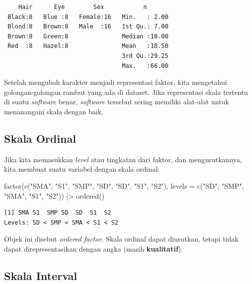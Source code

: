 \documentclass[
  letterpaper,
  DIV=11,
  numbers=noendperiod]{scrreprt}
\newenvironment{Shaded}{\begin{snugshade}}{\end{snugshade}}
\newcommand{\AttributeTok}[1]{\textcolor[rgb]{0.40,0.45,0.13}{#1}}
\newcommand{\FunctionTok}[1]{\textcolor[rgb]{0.28,0.35,0.67}{#1}}
\newcommand{\NormalTok}[1]{\textcolor[rgb]{0.00,0.23,0.31}{#1}}
\newcommand{\SpecialCharTok}[1]{\textcolor[rgb]{0.37,0.37,0.37}{#1}}
\newcommand{\StringTok}[1]{\textcolor[rgb]{0.13,0.47,0.30}{#1}}
\begin{document}
\begin{verbatim}
    Hair      Eye        Sex           n        
 Black:8   Blue :8   Female:16   Min.   : 2.00  
 Blond:8   Brown:8   Male  :16   1st Qu.: 7.00  
 Brown:8   Green:8               Median :10.00  
 Red  :8   Hazel:8               Mean   :18.50  
                                 3rd Qu.:29.25  
                                 Max.   :66.00  
\end{verbatim}

Setelah mengubah karakter menjadi representasi faktor, kita mengetahui
golongan-golongan rambut yang ada di dataset. Jika representasi skala
tertentu di suatu \emph{software} benar, \emph{software} tersebut sering
memiliki alat-alat untuk menanangani skala dengan baik.

\hypertarget{skala-ordinal}{%
\subsection{Skala Ordinal}\label{skala-ordinal}}

Jika kita memasukkan \emph{level} atau tingkatan dari faktor, dan
mengurutkannya, kita membuat suatu variabel dengan skala ordinal:

\begin{Shaded}
\begin{Highlighting}[]
\FunctionTok{factor}\NormalTok{(}\FunctionTok{c}\NormalTok{(}\StringTok{"SMA"}\NormalTok{, }\StringTok{"S1"}\NormalTok{, }\StringTok{"SMP"}\NormalTok{, }\StringTok{"SD"}\NormalTok{,}
         \StringTok{"SD"}\NormalTok{, }\StringTok{"S1"}\NormalTok{, }\StringTok{"S2"}\NormalTok{),}
       \AttributeTok{levels =} \FunctionTok{c}\NormalTok{(}\StringTok{"SD"}\NormalTok{, }\StringTok{"SMP"}\NormalTok{, }\StringTok{"SMA"}\NormalTok{, }\StringTok{"S1"}\NormalTok{, }\StringTok{"S2"}\NormalTok{)) }\SpecialCharTok{|\textgreater{}}
  \FunctionTok{ordered}\NormalTok{()}
\end{Highlighting}
\end{Shaded}

\begin{verbatim}
[1] SMA S1  SMP SD  SD  S1  S2 
Levels: SD < SMP < SMA < S1 < S2
\end{verbatim}

Objek ini disebut \emph{ordered factor}. Skala ordinal dapat diurutkan,
tetapi tidak dapat direpresentasikan dengan angka (masih
\textbf{kualitatif}).

\hypertarget{skala-interval}{%
\subsection{Skala Interval}\label{skala-interval}}
\end{document}
